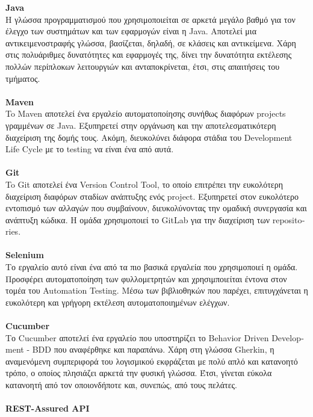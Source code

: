 \textbf{\textlatin{Java}}\\
Η γλώσσα προγραμματισμού που χρησιμοποιείται σε αρκετά μεγάλο βαθμό για τον έλεγχο των συστημάτων και των εφαρμογών είναι η \textlatin{Java}. Αποτελεί μια αντικειμενοστραφής γλώσσα, βασίζεται, δηλαδή, σε κλάσεις και αντικείμενα. Χάρη στις πολυάριθμες δυνατότητες και εφαρμογές της, δίνει την δυνατότητα εκτέλεσης πολλών περίπλοκων λειτουργιών και ανταποκρίνεται, έτσι, στις απαιτήσεις του τμήματος.\\ \\
\textbf{\textlatin{Maven}}\\
To \textlatin{Maven} αποτελεί ένα εργαλείο αυτοματοποίησης συνήθως διαφόρων \textlatin{projects} γραμμένων σε \textlatin{Java}. Εξυπηρετεί στην οργάνωση και την αποτελεσματικότερη διαχείριση της δομής τους. Ακόμη, διευκολύνει διάφορα στάδια του \textlatin{Development Life Cycle} με το \textlatin{testing} να είναι ένα από αυτά.\\ \\
\textbf{\textlatin{Git}}\\
To \textlatin{Git} αποτελεί ένα \textlatin{Version Control Tool}, το οποίο επιτρέπει την ευκολότερη διαχείριση διαφόρων σταδίων ανάπτυξης ενός \textlatin{project}. Εξυπηρετεί στον ευκολότερο εντοπισμό των αλλαγών που συμβαίνουν, διευκολύνοντας την ομαδική συνεργασία και ανάπτυξη κώδικα. Η ομάδα χρησιμοποιεί το \textlatin{GitLab} για την διαχείριση των \textlatin{repositories}.\\ \\
\textbf{\textlatin{Selenium}}\\
Το εργαλείο αυτό είναι ένα από τα πιο βασικά εργαλεία που χρησιμοποιεί η ομάδα. Προσφέρει αυτοματοποίηση των φυλλομετρητών και χρησιμποιείται έντονα στον τομέα του \textlatin{Automation Testing}. Μέσω των βιβλιοθηκών που παρέχει, επιτυγχάνεται η ευκολότερη και γρήγορη εκτέλεση αυτοματοποιημένων ελέγχων.\\ \\
\textbf{\textlatin{Cucumber}}\\
Το \textlatin{Cucumber} αποτελεί ένα εργαλείο που υποστηρίζει το \textlatin{Behavior Driven Development - BDD} που αναφέρθηκε και παραπάνω. Χάρη στη γλώσσα \textlatin{Gherkin}, η αναμενόμενη συμπεριφορά του λογισμικού εκφράζεται με πολύ απλό και κατανοητό τρόπο, ο οποίος πλησιάζει αρκετά την φυσική γλώσσα. Έτσι, γίνεται εύκολα κατανοητή από τον οποιονδήποτε και, συνεπώς, από τους πελάτες. \\ \\
\textbf{\textlatin{REST-Assured API}}\\

